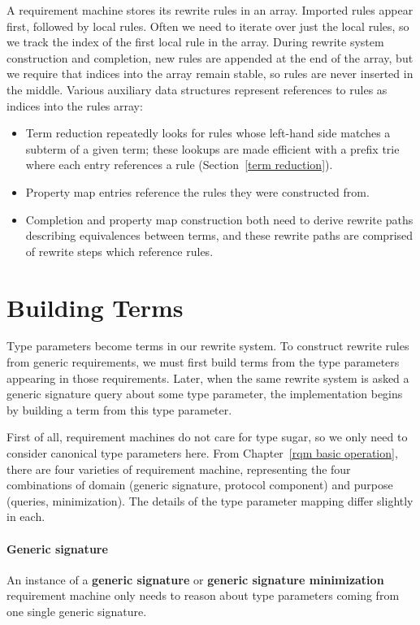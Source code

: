 \documentclass[../generics]{subfiles}
\begin{document}
%
%
A requirement machine stores its rewrite rules in an array. Imported rules appear first, followed by local rules. Often we need to iterate over just the local rules, so we track the index of the first local rule in the array. During rewrite system construction and completion, new rules are appended at the end of the array, but we require that indices into the array remain stable, so rules are never inserted in the middle. Various auxiliary data structures represent references to rules as indices into the rules array:
\begin{itemize}
\item Term reduction repeatedly looks for rules whose left-hand side matches a subterm of a given term; these lookups are made efficient with a prefix trie where each entry references a rule (Section~\ref{term reduction}).
\item Property map entries reference the rules they were constructed from.
\item Completion and property map construction both need to derive rewrite paths describing equivalences between terms, and these rewrite paths are comprised of rewrite steps which reference rules.
\end{itemize}

\section{Building Terms}\label{building terms}

%
Type parameters become terms in our rewrite system. To construct rewrite rules from generic requirements, we must first build terms from the type parameters appearing in those requirements. Later, when the same rewrite system is asked a generic signature query about some type parameter, the implementation begins by building a term from this type parameter.

First of all, requirement machines do not care for type sugar, so we only need to consider canonical type parameters here. From Chapter~\ref{rqm basic operation}, there are four varieties of requirement machine, representing the four combinations of domain (generic signature, protocol component) and purpose (queries, minimization). The details of the type parameter mapping differ slightly in each.

\paragraph{Generic signature}
%
%
%
%
An instance of a \textbf{generic signature} or \textbf{generic signature minimization} requirement machine only needs to reason about type parameters coming from one single generic signature.
\end{document}
